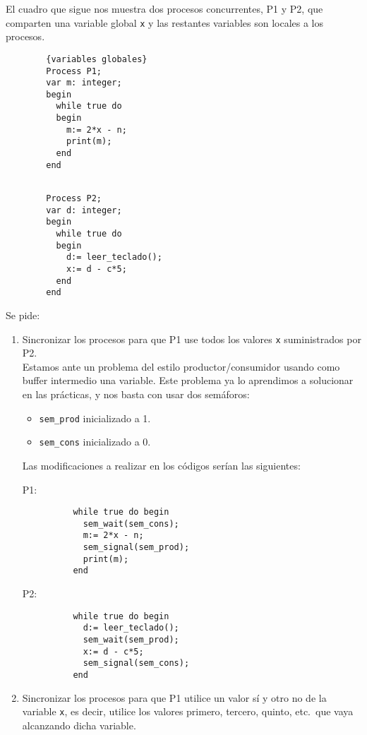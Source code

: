 \begin{ejercicio}
    El cuadro que sigue nos muestra dos procesos concurrentes, P1 y P2, que comparten una variable global \verb|x| y las restantes variables son locales a los procesos.
    \setlength{\columnsep}{1cm} %
    \begin{multicols}{2}
        \begin{verbatim}
        {variables globales}
        Process P1;
        var m: integer;
        begin
          while true do
          begin
            m:= 2*x - n;
            print(m);
          end
        end
        \end{verbatim}
        
        \begin{verbatim}

        Process P2;
        var d: integer;
        begin
          while true do
          begin
            d:= leer_teclado();
            x:= d - c*5;
          end
        end
        \end{verbatim}
    \end{multicols}
    Se pide:
    \begin{enumerate}
        \item Sincronizar los procesos para que P1 use todos los valores \verb|x| suministrados por P2.\\

            Estamos ante un problema del estilo productor/consumidor usando como buffer intermedio una variable. Este problema ya lo aprendimos a solucionar en las prácticas, y nos basta con usar dos semáforos:
            \begin{itemize}
                \item \verb|sem_prod| inicializado a 1.
                \item \verb|sem_cons| inicializado a 0.
            \end{itemize}
            Las modificaciones a realizar en los códigos serían las siguientes:
    \begin{multicols}{2}
        P1:
        \begin{verbatim}
          while true do begin
            sem_wait(sem_cons);  
            m:= 2*x - n;
            sem_signal(sem_prod);  
            print(m);
          end
        \end{verbatim}
        
        P2:
        \begin{verbatim}
          while true do begin
            d:= leer_teclado();
            sem_wait(sem_prod);  
            x:= d - c*5;
            sem_signal(sem_cons);  
          end
        \end{verbatim}
    \end{multicols}
        \item Sincronizar los procesos para que P1 utilice un valor sí y otro no de la variable \verb|x|, es decir, utilice los valores primero, tercero, quinto, etc.\ que vaya alcanzando dicha variable.\\


\end{enumerate}
\end{ejercicio}
